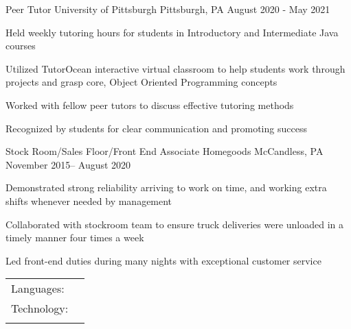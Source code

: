 \documentclass[]{awesome-cv}
\begin{document}
\vspace{-2mm}
\begin{cventries}
	\cventry
	{Peer Tutor}
	{University of Pittsburgh}
	{Pittsburgh, PA}
	{August 2020 - May 2021}
	{\begin{cvitems}
		\item {Held weekly tutoring hours for students in Introductory and Intermediate Java courses }
		\item {Utilized TutorOcean interactive virtual classroom to help students work through projects and grasp core,  Object Oriented Programming concepts}
		\item {Worked with fellow peer tutors to discuss effective tutoring methods}
		\item {Recognized by students for clear communication and promoting success}
		\end{cvitems}}
	\cventry
	{Stock Room/Sales Floor/Front End Associate}
	{Homegoods}
	{McCandless, PA}
	{November 2015– August 2020}
	{\begin{cvitems}
		\item {Demonstrated strong reliability arriving to work on time, and working extra shifts whenever needed by management}
		\item {Collaborated with stockroom team to ensure truck deliveries were unloaded in a timely manner four times a week }
		\item {Led front-end duties during many nights with exceptional customer service}
		\end{cvitems}}
\end{cventries}
\vspace{-4mm}
\begin{cventries}
	\cventry
	{}
	{\def\arraystretch{1.15}{\begin{tabular}{ l l }
		Languages:  & {\skill{ Java, SQL, HTML, CSS, JavaScript, PHP, Python}} \\
		Technology:  & {\skill{ Swagger, PostgreSQL, JUnit, Cucumber, Bootstrap, Flask, Git/Github, Docker, }} \\ &{\skill{ Google Cloud Platform}} \\
		\end{tabular}}}
	{}
	{}
	{}
\end{cventries}
\end{document}
